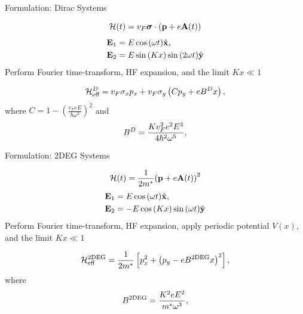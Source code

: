 \documentclass[xcolor=dvipsnames,10pt,aspectratio=169]{beamer}
\let\oldhat\hat
\renewcommand{\hat}[1]{\oldhat{\mathbf{#1}}}
\renewcommand{\vec}[1]{\mathbf{#1}}
\newcommand{\ham}{\mathcal{H}}
\newcommand{\FO}{Formulation}
\begin{document}
  \begin{frame}{\FO: Dirac Systems}

    \begin{equation}
      \small
      \ham (t) = v_F \bm{\sigma} \cdot \left(\vec{p} + e \vec{A}(t)\right)
    \end{equation}
    \begin{align}
      \small
      \vec{E}_1 &= E\cos{(\omega t)} \hat{x}, \nonumber \\
      \vec{E}_2 &= E\sin{(Kx)}\sin{(2\omega t)} \hat{y}
    \end{align}
    Perform Fourier time-transform, HF expansion, and the limit $Kx\ll1$

    \begin{equation}
      \small
      \ham_{\text{eff}}^{D} = v_F \sigma_x p_x + v_F \sigma_y \left( C p_y + eB^Dx \right),
    \end{equation}
    where $C = 1 - {\left(\tfrac{v_F eE}{\hbar \omega^2}\right)}^2$ and
    \begin{align}
      \small
      B^{D} &= \frac{K v_F^2 e^2 E^3}{4\hbar^2 \omega^5}, \\
    \end{align}


  \end{frame}

  \begin{frame}{\FO: 2DEG Systems}

    \begin{equation}
      \small
      \ham (t) = \dfrac{1}{2m^*} {\left( \vec{p} +e \vec{A}(t)\right)}^2
    \end{equation}
    \begin{align}
      \small
      \vec{E}_1 &= E\cos{(\omega t)} \hat{x},\nonumber \\
      \vec{E}_2 &= -E\cos{(Kx)}\sin{(\omega t)} \hat{y}
    \end{align}
    Perform Fourier time-transform, HF expansion, apply periodic potential $V(x)$, and the limit $Kx\ll1$

    \begin{equation}
      \small
      \ham_{\text{eff}}^{\text{2DEG}} = \frac{1}{2m^*} \left[ p_x^2 + {\left(p_y - eB^{\text{2DEG}}x \right)}^2\right],
    \end{equation}
    where
    \begin{align}
      \small
      B^{\text{2DEG}} &= \frac{K^2 e E^2}{m^* \omega^3}, \\
    \end{align}

  \end{frame}
\end{document}
